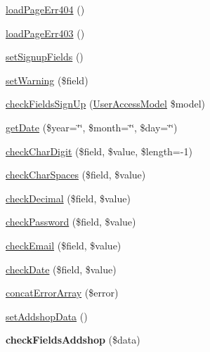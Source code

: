 \begin{DoxyCompactItemize}
\item 
\hyperlink{classBasePageController_a07d3e03b8e2ec5cc698f057a3496c14b}{load\+Page\+Err404} ()
\item 
\hyperlink{classBasePageController_a9ecd03fb676ab32ee9c2cb4e412757cc}{load\+Page\+Err403} ()
\item 
\hyperlink{classBasePageController_a877c4f32b7d39e566f7832aef94c2f11}{set\+Signup\+Fields} ()
\item 
\hyperlink{classBasePageController_a777f34065716ce7f7706ea745fbdd254}{set\+Warning} (\$field)
\item 
\hyperlink{classBasePageController_a56e85dfb915144831cf39435b88774f5}{check\+Fields\+Sign\+Up} (\hyperlink{classUserAccessModel}{User\+Access\+Model} \$model)
\item 
\hyperlink{classBasePageController_a2aaad6f0fa836c9d7e6d9df5974cb4a7}{get\+Date} (\$year=\char`\"{}\char`\"{}, \$month=\char`\"{}\char`\"{}, \$day=\char`\"{}\char`\"{})
\item 
\hyperlink{classBasePageController_ade6dad738c6fce22cf8b44028628090d}{check\+Char\+Digit} (\$field, \$value, \$length=-\/1)
\item 
\hyperlink{classBasePageController_a82b064f99d35b69e42a6a267e28ed04b}{check\+Char\+Spaces} (\$field, \$value)
\item 
\hyperlink{classBasePageController_ad79d970cb91298dfa2206bfe22516618}{check\+Decimal} (\$field, \$value)
\item 
\hyperlink{classBasePageController_a6829b94ed721619b43879475c75b8fc8}{check\+Password} (\$field, \$value)
\item 
\hyperlink{classBasePageController_a5a0788181caf223a4ce208702c93e0c8}{check\+Email} (\$field, \$value)
\item 
\hyperlink{classBasePageController_a6f1a0a900ee8f95b6b6f12c52272a9a7}{check\+Date} (\$field, \$value)
\item 
\hyperlink{classBasePageController_ac0083ad81bbac88f3ca4bdf258566a07}{concat\+Error\+Array} (\$error)
\item 
\hyperlink{classBasePageController_a153a1dcf2e23be9499f8083828671c26}{set\+Addshop\+Data} ()
\item 
\hypertarget{classBasePageController_aa71c4d8a5aa7b90d2074e511fe4ddcc2}{{\bfseries check\+Fields\+Addshop} (\$data)}\label{classBasePageController_aa71c4d8a5aa7b90d2074e511fe4ddcc2}

\end{DoxyCompactItemize}
